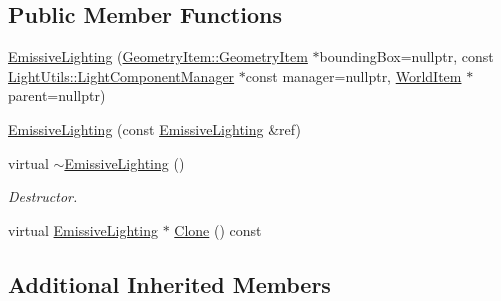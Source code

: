 \subsection*{Public Member Functions}
\begin{DoxyCompactItemize}
\item 
\mbox{\hyperlink{class_geometry_engine_1_1_geometry_world_item_1_1_geometry_light_1_1_emissive_lighting_a224b3b3fd70066beab9f7229c7c45783}{Emissive\+Lighting}} (\mbox{\hyperlink{class_geometry_engine_1_1_geometry_world_item_1_1_geometry_item_1_1_geometry_item}{Geometry\+Item\+::\+Geometry\+Item}} $\ast$bounding\+Box=nullptr, const \mbox{\hyperlink{class_geometry_engine_1_1_light_utils_1_1_light_component_manager}{Light\+Utils\+::\+Light\+Component\+Manager}} $\ast$const manager=nullptr, \mbox{\hyperlink{class_geometry_engine_1_1_geometry_world_item_1_1_world_item}{World\+Item}} $\ast$parent=nullptr)
\item 
\mbox{\hyperlink{class_geometry_engine_1_1_geometry_world_item_1_1_geometry_light_1_1_emissive_lighting_aac76201e50ff6a2a62ec84225c7bffaa}{Emissive\+Lighting}} (const \mbox{\hyperlink{class_geometry_engine_1_1_geometry_world_item_1_1_geometry_light_1_1_emissive_lighting}{Emissive\+Lighting}} \&ref)
\item 
\mbox{\label{class_geometry_engine_1_1_geometry_world_item_1_1_geometry_light_1_1_emissive_lighting_a91b7faede57c7eb04237b5296ef33db9}} 
virtual \mbox{\hyperlink{class_geometry_engine_1_1_geometry_world_item_1_1_geometry_light_1_1_emissive_lighting_a91b7faede57c7eb04237b5296ef33db9}{$\sim$\+Emissive\+Lighting}} ()
\begin{DoxyCompactList}\small\item\em Destructor. \end{DoxyCompactList}\item 
virtual \mbox{\hyperlink{class_geometry_engine_1_1_geometry_world_item_1_1_geometry_light_1_1_emissive_lighting}{Emissive\+Lighting}} $\ast$ \mbox{\hyperlink{class_geometry_engine_1_1_geometry_world_item_1_1_geometry_light_1_1_emissive_lighting_ac7e3e90cadf700764fccdacc94238bac}{Clone}} () const
\end{DoxyCompactItemize}
\subsection*{Additional Inherited Members}



